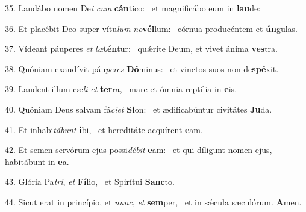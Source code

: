 35. Laudábo nomen De\textit{i} \textit{cum} \textbf{cán}tico: \ast\  et magnificábo eum in \textbf{lau}de:\

36. Et placébit Deo super vítu\textit{lum} \textit{no}\textbf{vél}lum: \ast\  córnua producéntem et \textbf{ún}gulas.\

37. Vídeant páuperes \textit{et} \textit{læ}\textbf{tén}tur: \ast\  quǽrite Deum, et vivet ánima \textbf{ves}tra.\

38. Quóniam exaudívit páu\textit{pe}\textit{res} \textbf{Dó}minus: \ast\  et vinctos suos non de\textbf{spé}xit.\

39. Laudent illum cæ\textit{li} \textit{et} \textbf{ter}ra, \ast\  mare et ómnia reptília in \textbf{e}is.\

40. Quóniam Deus salvam fá\textit{ci}\textit{et} \textbf{Si}on: \ast\  et ædificabúntur civitátes \textbf{Ju}da.\

41. Et inhabi\textit{tá}\textit{bunt} \textbf{i}bi, \ast\  et hereditáte acquírent \textbf{e}am.\

42. Et semen servórum ejus possi\textit{dé}\textit{bit} \textbf{e}am: \ast\  et qui díligunt nomen ejus, habitábunt in \textbf{e}a.\

43. Glória Pa\textit{tri}, \textit{et} \textbf{Fí}lio, \ast\  et Spirítui \textbf{Sanc}to.\

44. Sicut erat in princípio, et \textit{nunc}, \textit{et} \textbf{sem}per, \ast\  et in sǽcula sæculórum. \textbf{A}men.\

